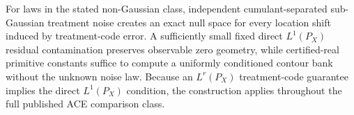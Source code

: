 For laws in the stated non-Gaussian class, independent cumulant-separated sub-Gaussian treatment noise creates an exact null space for every location shift induced by treatment-code error.  A sufficiently small fixed direct \(L^1(P_X)\) residual contamination preserves observable zero geometry, while certified-real primitive constants suffice to compute a uniformly conditioned contour bank without the unknown noise law.  Because an \(L^r(P_X)\) treatment-code guarantee implies the direct \(L^1(P_X)\) condition, the construction applies throughout the full published ACE comparison class.